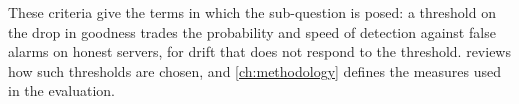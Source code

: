 These criteria give the terms in which the sub-question is posed: a threshold on the drop in goodness trades the probability and speed of detection against false alarms on honest servers, for drift that does not respond to the threshold.  reviews how such thresholds are chosen, and \cref{ch:methodology} defines the measures used in the evaluation.

